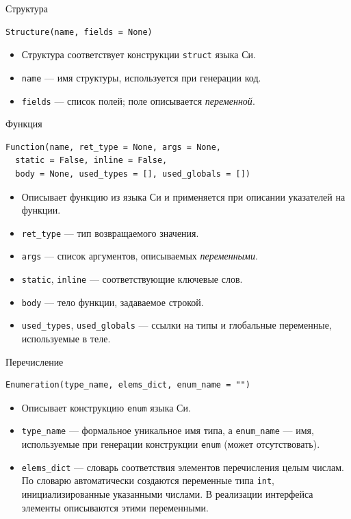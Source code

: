 \documentclass[unicode,hyperref={unicode=true}]{beamer}
\theoremstyle{definition}
\theoremstyle{plain}
\begin{document}
\begin{frame}[fragile]{Структура}
\lstset{language=Python}
\begin{lstlisting}
Structure(name, fields = None)
\end{lstlisting}
\vfill
\begin{itemize}
\item Структура соответствует конструкции \texttt{struct} языка Си.
\item \texttt{name} --- имя структуры, используется при генерации код.
\item \texttt{fields} --- список полей; поле описывается \textit{переменной}.
\end{itemize}
\end{frame}



\begin{frame}[fragile]{Функция}
\lstset{language=Python}
\begin{lstlisting}
Function(name, ret_type = None, args = None,
  static = False, inline = False,
  body = None, used_types = [], used_globals = [])
\end{lstlisting}
\vfill
\begin{itemize}
\item Описывает функцию из языка Си и применяется при описании указателей на
    функции.
\item \texttt{ret\_type} --- тип возвращаемого значения.
\item \texttt{args} --- список аргументов, описываемых \textit{переменными}.
\item \texttt{static}, \texttt{inline} --- соответствующие ключевые слов.
\item \texttt{body} --- тело функции, задаваемое строкой.
\item \texttt{used\_types}, \texttt{used\_globals} --- ссылки на типы и
    глобальные переменные, используемые в теле.
\end{itemize}
\end{frame}



\begin{frame}[fragile]{Перечисление}
\lstset{language=Python}
\begin{lstlisting}
Enumeration(type_name, elems_dict, enum_name = "")
\end{lstlisting}
\vfill
\begin{itemize}
\item Описывает конструкцию \texttt{enum} языка Си.
\item \texttt{type\_name} --- формальное уникальное имя типа, а
    \texttt{enum\_name} --- имя, используемые при генерации конструкции
    \texttt{enum} (может отсутствовать).
\item \texttt{elems\_dict} --- словарь соответствия элементов перечисления
    целым числам. По словарю автоматически создаются переменные типа
    \texttt{int}, инициализированные указанными числами. В реализации
    интерфейса элементы описываются этими переменными.
\end{itemize}
\end{frame}
\end{document}
